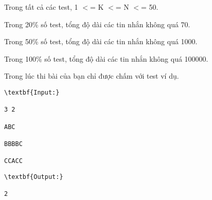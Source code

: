 Trong tất cả các test, 1 $<$= K $<$= N $<$= 50.

Trong 20\% số test, tổng độ dài các tin nhắn không quá 70.

Trong 50\% số test, tổng độ dài các tin nhắn không quá 1000.

Trong 100\% số test, tổng độ dài các tin nhắn không quá 100000.

Trong lúc thi bài của bạn chỉ được chấm với test ví dụ.
\begin{verbatim}
\textbf{Input:}

3 2

ABC

BBBBC

CCACC\end{verbatim}
\begin{verbatim}
\textbf{Output:}

2\end{verbatim}